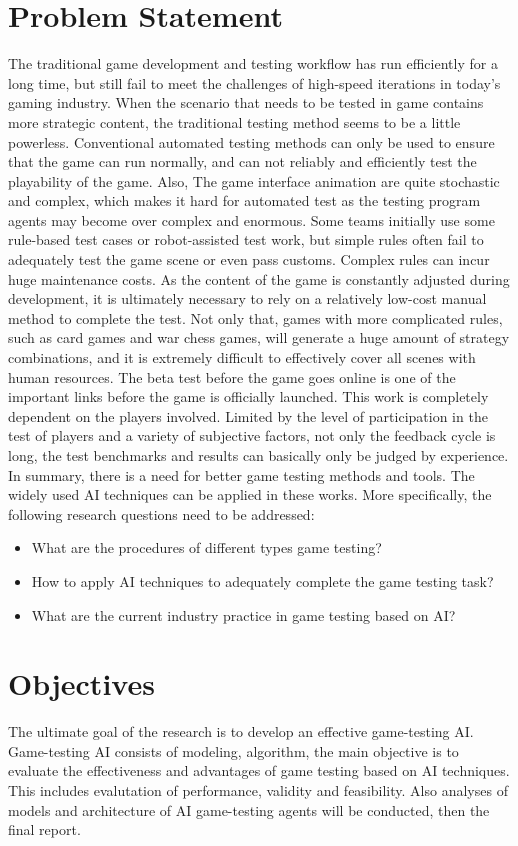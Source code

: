 \documentclass[11pt,en,authoryear]{elegantpaper}
\begin{document}
\section{Problem Statement}
\noindent
The traditional game development and testing workflow has run efficiently for a long time, but still fail to meet the challenges of high-speed iterations in today's gaming industry.
When the scenario that needs to be tested in game contains more strategic content, the traditional testing method seems to be a little powerless. Conventional automated testing methods can only be used to ensure that the game can run normally, and can not reliably and efficiently test the playability of the game. Also, The game interface animation are quite stochastic and complex, which makes it hard for automated test as the testing program agents may become over complex and enormous. Some teams initially use some rule-based test cases or robot-assisted test work, but simple rules often fail to adequately test the game scene or even pass customs. Complex rules can incur huge maintenance costs. As the content of the game is constantly adjusted during development, it is ultimately necessary to rely on a relatively low-cost manual method to complete the test. Not only that, games with more complicated rules, such as card games and war chess games, will generate a huge amount of strategy combinations, and it is extremely difficult to effectively cover all scenes with human resources. The beta test before the game goes online is one of the important links before the game is officially launched. This work is completely dependent on the players involved. Limited by the level of participation in the test of players and a variety of subjective factors, not only the feedback cycle is long, the test benchmarks and results can basically only be judged by experience. In summary, there is a need for better game testing methods and tools. The widely used AI techniques can be applied in these works. More specifically, the following research questions need to be addressed:
\begin{itemize}
    \item What are the procedures of different types game testing?
    \item How to apply AI techniques to adequately complete the game testing task?
    \item What are the current industry practice in game testing based on AI?
\end{itemize}

\section{Objectives}
\noindent
The ultimate goal of the research is to develop an effective game-testing AI. Game-testing AI consists of modeling, algorithm, the main objective is to evaluate the effectiveness and advantages of game testing based on AI techniques. This includes evalutation of performance, validity and feasibility. Also analyses of models and architecture of AI game-testing agents will be conducted, then the final report. 
\end{document}
